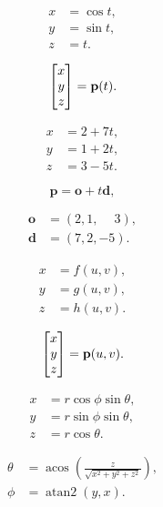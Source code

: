 \[
  \begin{aligned}
    x & =\cos t, \\
    y & =\sin t, \\
    z & =t.
  \end{aligned}
\]

\[
  \begin{bmatrix}
    x \\
    y \\
    z
  \end{bmatrix}={\bf p}(t).
\]

\[
  \begin{aligned}
    x & =2+7t, \\
    y & =1+2t, \\
    z & =3-5t.
  \end{aligned}
\]

\[
  \mathbf{p}=\mathbf{o}+t\mathbf{d},
\]

\[
  \begin{aligned}
    \mathbf{o} & =(2,1,\phantom{-}3), \\
    \mathbf{d} & =(7,2,-5).
  \end{aligned}
\]

\[
  \begin{aligned}
    x & =f(u,v), \\
    y & =g(u,v), \\
    z & =h(u,v).
  \end{aligned}
\]

\[
  \begin{bmatrix}
    x \\
    y \\
    z
  \end{bmatrix}={\bf p}(u,v).
\]

\begin{equation}
  \begin{aligned}
    x & =r\cos\phi\sin\theta, \\
    y & =r\sin\phi\sin\theta, \\
    z & =r\cos\theta.
  \end{aligned}
\end{equation}

\begin{equation}
  \begin{aligned}
    \theta & =\operatorname{acos}(\frac{z}{\sqrt{x^{2}+y^{2}+z^{2}}}), \\
    \phi   & =\operatorname{atan2}(y,x).
  \end{aligned}
\end{equation}

